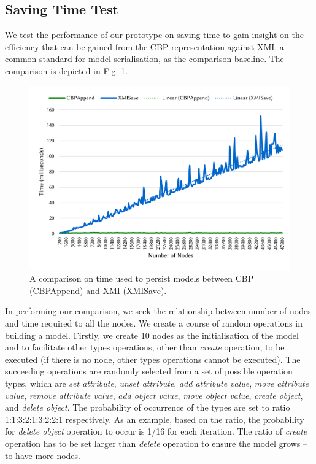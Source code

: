 \documentclass{llncs}
\begin{document}
{\subsection{Saving Time Test}
\label{subsec:saving_time_test}
We test the performance of our prototype on saving time to gain insight on the efficiency that can be gained from the CBP representation against XMI, a common standard for model serialisation, as the comparison baseline. The  comparison is depicted in Fig. \ref{fig:append_speed}.

\begin{figure}[ht]
\centering
\includegraphics[width=\linewidth]{append_speed}
\caption{A comparison on time used to persist models between CBP (CBPAppend) and XMI (XMISave).}
\label{fig:append_speed}
\end{figure}

In performing our comparison, we seek the relationship between number of nodes and time required to all the nodes. We create a course of random operations in building a model. 
Firstly, we create 10 nodes as the initialisation of the model and to facilitate other types operations, other than \emph{create} operation, to be executed (if there is no node, other types operations cannot be executed). The succeeding operations are randomly selected from a set of possible operation types, which are \emph{set attribute}, \emph{unset attribute}, \emph{add attribute value}, \emph{move attribute value}, \emph{remove attribute value}, \emph{add object value}, \emph{move object value}, \emph{create object}, and \emph{delete object}. The probability of occurrence of the types are set to ratio 1:1:3:2:1:3:2:2:1 respectively. As an example, based on the ratio, the probability for \emph{delete object} operation to occur is 1/16 for each iteration. The ratio of  \emph{create} operation has to be set larger than \emph{delete} operation to ensure the model grows -- to have more nodes.  

}
\end{document}
